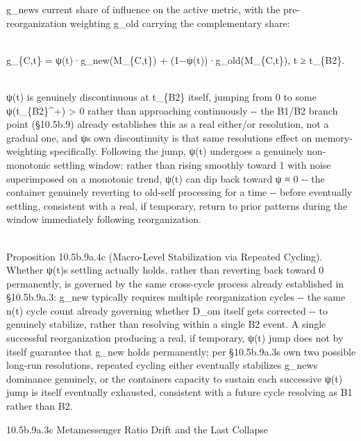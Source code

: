 \documentclass[
]{article}
\begin{document}
g\_new\textquotesingle s current share of influence on the active
metric, with the pre-reorganization weighting g\_old carrying the
complementary share:\\
\strut \\
g\_\{C,t\} = ψ(t)·g\_new(M\_\{C,t\}) + (1−ψ(t))·g\_old(M\_\{C,t\}), t ≥
t\_\{B2\}.\\
\strut \\
ψ(t) is genuinely discontinuous at t\_\{B2\} itself, jumping from 0 to
some ψ(t\_\{B2\}\^{}+) \textgreater{} 0 rather than approaching
continuously -\/- the B1/B2 branch point (§10.5b.9) already establishes
this as a real either/or resolution, not a gradual one, and
ψ\textquotesingle s own discontinuity is that same
resolution\textquotesingle s effect on memory-weighting specifically.
Following the jump, ψ(t) undergoes a genuinely non-monotonic settling
window: rather than rising smoothly toward 1 with noise superimposed on
a monotonic trend, ψ(t) can dip back toward ψ ≈ 0 -\/- the container
genuinely reverting to old-self processing for a time -\/- before
eventually settling, consistent with a real, if temporary, return to
prior patterns during the window immediately following reorganization.\\
\strut \\
Proposition 10.5b.9a.4c (Macro-Level Stabilization via Repeated
Cycling). Whether ψ(t)\textquotesingle s settling actually holds, rather
than reverting back toward 0 permanently, is governed by the same
cross-cycle process already established in §10.5b.9a.3: g\_new typically
requires multiple reorganization cycles -\/- the same n(t) cycle count
already governing whether D\_om itself gets corrected -\/- to genuinely
stabilize, rather than resolving within a single B2 event. A single
successful reorganization producing a real, if temporary, ψ(t) jump does
not by itself guarantee that g\_new holds permanently; per
§10.5b.9a.3\textquotesingle s own two possible long-run resolutions,
repeated cycling either eventually stabilizes g\_new\textquotesingle s
dominance genuinely, or the container\textquotesingle s capacity to
sustain each successive ψ(t) jump is itself eventually exhausted,
consistent with a future cycle resolving as B1 rather than B2.

10.5b.9a.3c Metamessenger Ratio Drift and the Last Collapse
\end{document}
